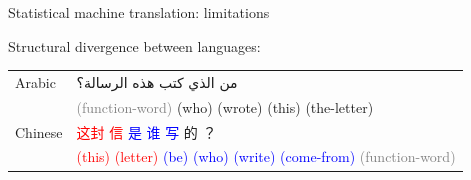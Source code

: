 \documentclass{beamer}
\newenvironment{CJK}{\fontspec[Scale=0.9]{PMingLiU}}{}
\newenvironment{Geeza}{\fontspec[Scale=0.9]{Geeza Pro}}{}
\begin{document}
\begin{frame}[t]{Statistical machine translation: limitations}
\begin{exampleblock}{Structural divergence between languages:}
\begin{table}
{\begin{tabular}{|l|l|}
      \hline
      Arabic   & \begin{Geeza}من الذي كتب هذه الرسالة؟\end{Geeza} \\
               & \textcolor{gray}{(function-word)} (who) (wrote) (this) (the-letter) \\
      \hline
      Chinese  & \begin{CJK}\textcolor{red}{这封  信}  \textcolor{blue}{是  谁  写}  的 ？\end{CJK} \\
               & \textcolor{red}{(this) (letter)} \textcolor{blue}{(be) (who) (write) (come-from)} \textcolor{gray}{(function-word)} \\
      \hline
    \end{tabular}
  }
  \end{table}
\end{exampleblock}
\end{frame}
\end{document}
